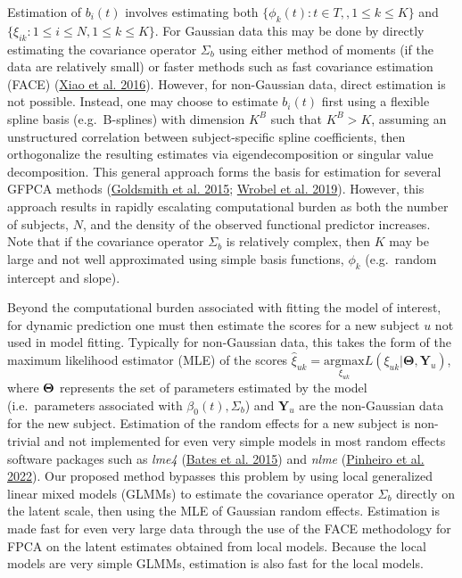 \documentclass[
  11pt,
]{article}
\begin{document}
Estimation of \(b_i(t)\) involves estimating both
\(\{\phi_k(t): t \in T, , 1 \leq k \leq K\}\) and
\(\{\xi_{ik}: 1 \leq i \leq N, 1 \leq k \leq K\}\). For Gaussian data
this may be done by directly estimating the covariance operator
\(\Sigma_b\) using either method of moments (if the data are relatively
small) or faster methods such as fast covariance estimation (FACE)
(\protect\hyperlink{ref-face}{Xiao et al. 2016}). However, for
non-Gaussian data, direct estimation is not possible. Instead, one may
choose to estimate \(b_i(t)\) first using a flexible spline basis
(e.g.~B-splines) with dimension \(K^B\) such that \(K^B > K\), assuming
an unstructured correlation between subject-specific spline
coefficients, then orthogonalize the resulting estimates via
eigendecomposition or singular value decomposition. This general
approach forms the basis for estimation for several GFPCA methods
(\protect\hyperlink{ref-goldsmith2015}{Goldsmith et al. 2015};
\protect\hyperlink{ref-wrobel2019}{Wrobel et al. 2019}). However, this
approach results in rapidly escalating computational burden as both the
number of subjects, \(N\), and the density of the observed functional
predictor increases. Note that if the covariance operator \(\Sigma_b\)
is relatively complex, then \(K\) may be large and not well approximated
using simple basis functions, \(\phi_k\) (e.g.~random intercept and
slope).

Beyond the computational burden associated with fitting the model of
interest, for dynamic prediction one must then estimate the scores for a
new subject \(u\) not used in model fitting. Typically for non-Gaussian
data, this takes the form of the maximum likelihood estimator (MLE) of
the scores
\(\hat{\xi}_{uk} = \underset{\xi_{uk}}{\mathrm{argmax}} L(\xi_{uk}|\boldsymbol{\Theta}, \boldsymbol{Y}_{u})\),
where \(\bf{\Theta}\) represents the set of parameters estimated by the
model (i.e.~parameters associated with \(\beta_0(t), \Sigma_b\)) and
\(\boldsymbol{Y}_u\) are the non-Gaussian data for the new subject.
Estimation of the random effects for a new subject is non-trivial and
not implemented for even very simple models in most random effects
software packages such as \emph{lme4}
(\protect\hyperlink{ref-lme4}{Bates et al. 2015}) and \emph{nlme}
(\protect\hyperlink{ref-nlme}{Pinheiro et al. 2022}). Our proposed
method bypasses this problem by using local generalized linear mixed
models (GLMMs) to estimate the covariance operator \(\Sigma_b\) directly
on the latent scale, then using the MLE of Gaussian random effects.
Estimation is made fast for even very large data through the use of the
FACE methodology for FPCA on the latent estimates obtained from local
models. Because the local models are very simple GLMMs, estimation is
also fast for the local models.
\end{document}
